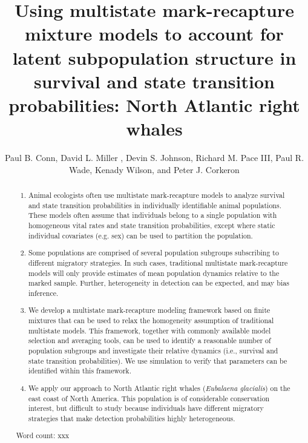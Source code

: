 \documentclass[times,mee,doublespace,]{besauth2}
\begin{document}


\title{Using multistate mark-recapture mixture models to account for latent subpopulation structure in survival and state transition probabilities: North Atlantic right whales \footnotemark[2]}

\author{Paul B. Conn\corrauth, David L. Miller , Devin S. Johnson, Richard M. Pace III, Paul R. Wade, Kenady Wilson, and Peter J. Corkeron }


\address{Marine Mammal Laboratory, Alaska Fisheries Science Center, National Marine Fisheries Service, NOAA, 7600 Sand Point Way NE, Seattle, WA 98115 USA;  Northeast Fisheries Science Center, National Marine Fisheries Service, NOAA
NOAA, 166 Water Street, Woods Hole, MA 02543 USA}


\begin{abstract}
\small
\begin{enumerate}
\item  Animal ecologists often use multistate mark-recapture models to analyze survival and state transition probabilities in individually identifiable animal populations.  These models often assume that individuals belong to a single population with homogeneous vital rates and state transition probabilities, except where static individual covariates (e.g. sex) can be used to partition the population.

\item Some populations are comprised of several population subgroups subscribing to different migratory strategies.  In such cases, traditional multistate mark-recapture models will only provide estimates of mean population dynamics relative to the marked sample.  Further, heterogeneity in detection can be expected, and may bias inference.

\item We develop a multistate mark-recapture modeling framework based on finite mixtures that can be used to relax the homogeneity assumption of traditional multistate models.  This framework, together with commonly available model selection and averaging tools, can be used to identify a reasonable number of population subgroups and investigate their relative dynamics (i.e., survival and state transition probabilities).  We use simulation to verify that parameters can be identified within this framework.

\item We apply our approach to North Atlantic right whales (\textit{Eubalaena glacialis}) on the east coast of North America. This population is of considerable conservation interest, but difficult to study because individuals have different migratory strategies that make detection probabilities highly heterogeneous.

\end{enumerate}


 Word count: xxx
\end{abstract}
\end{document}
